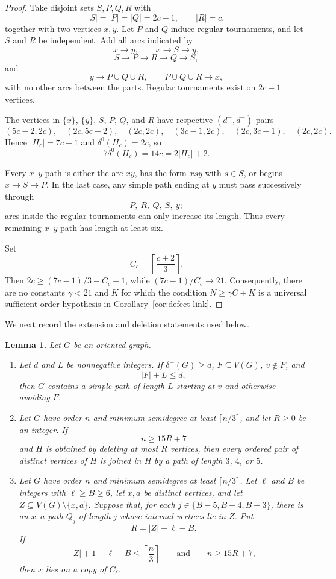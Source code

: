 \documentclass[11pt]{amsart}
\newtheorem{lemma}[theorem]{Lemma}
\theoremstyle{definition}
\begin{document}
\begin{proof}
Take disjoint sets $S,P,Q,R$ with
\[
  |S|=|P|=|Q|=2c-1,\qquad |R|=c,
\]
together with two vertices $x,y$.  Let $P$ and $Q$ induce regular
tournaments, and let $S$ and $R$ be independent.  Add all arcs
indicated by
\[
  x\to y,\qquad x\to S\to y,
\]
\[
  S\to P\to R\to Q\to S,
\]
and
\[
  y\to P\cup Q\cup R,
  \qquad P\cup Q\cup R\to x,
\]
with no other arcs between the parts.  Regular tournaments exist on
$2c-1$ vertices.

The vertices in $\{x\}$, $\{y\}$, $S$, $P$, $Q$, and $R$ have
respective $(d^-,d^+)$-pairs
\[
  (5c-2,2c),\quad (2c,5c-2),\quad (2c,2c),
  \quad (3c-1,2c),\quad (2c,3c-1),\quad (2c,2c).
\]
Hence $|H_c|=7c-1$ and $\delta^0(H_c)=2c$, so
\[
  7\delta^0(H_c)=14c=2|H_c|+2.
\]

Every $x$--$y$ path is either the arc $xy$, has the form $xsy$ with
$s\in S$, or begins $x\to S\to P$.  In the last case, any simple
path ending at $y$ must pass successively through
\[
  P,\ R,\ Q,\ S,\ y;
\]
arcs inside the regular tournaments can only increase its length.
Thus every remaining $x$--$y$ path has length at least six.

Set
\[
  C_c=\left\lceil\frac{c+2}{3}\right\rceil.
\]
Then $2c\ge(7c-1)/3-C_c+1$, while
$(7c-1)/C_c\to21$.  Consequently, there are no constants
$\gamma<21$ and $K$ for which the condition $N\ge\gamma C+K$ is a
universal sufficient order hypothesis in Corollary~\ref{cor:defect-link}.
\end{proof}

We next record the extension and deletion statements used below.

\begin{lemma}\label{lem:extension-deletion}
Let $G$ be an oriented graph.
\begin{enumerate}
\item Let $d$ and $L$ be nonnegative integers.  If
$\delta^+(G)\ge d$, $F\subseteq V(G)$, $v\notin F$, and
\[
  |F|+L\le d,
\]
then $G$ contains a simple path of length $L$ starting at $v$ and otherwise avoiding $F$.
\item Let $G$ have order $n$ and minimum semidegree at least
$\lceil n/3\rceil$, and let $R\ge0$ be an integer.  If
\[
  n\ge15R+7
\]
and $H$ is obtained by deleting at most $R$ vertices, then every
ordered pair of distinct vertices of $H$ is joined in $H$ by a path
of length $3$, $4$, or $5$.
\item Let $G$ have order $n$ and minimum semidegree at least
$\lceil n/3\rceil$.  Let $\ell$ and $B$ be integers with
$\ell\ge B\ge6$, let $x,a$ be distinct
vertices, and let $Z\subseteq V(G)\setminus\{x,a\}$.  Suppose that,
for each $j\in\{B-5,B-4,B-3\}$, there is an $x$--$a$ path $Q_j$ of
length $j$ whose internal vertices lie in $Z$.  Put
\[
  R=|Z|+\ell-B.
\]
If
\[
  |Z|+1+\ell-B\le\left\lceil\frac n3\right\rceil
  \qquad\text{and}\qquad
  n\ge15R+7,
\]
then $x$ lies on a copy of $C_\ell$.
\end{enumerate}
\end{lemma}
\end{document}
